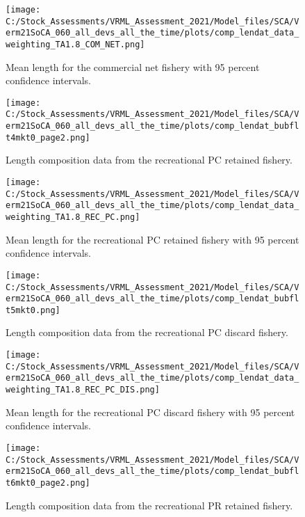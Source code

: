 \documentclass[11pt,
  english,
  a4paper,
]{article}
\begin{document}
\begin{figure}
\centering
\texttt{[image: C:/Stock\_Assessments/VRML\_Assessment\_2021/Model\_files/SCA/Verm21SoCA\_060\_all\_devs\_all\_the\_time/plots/comp\_lendat\_data\_weighting\_TA1.8\_COM\_NET.png]}
\caption{Mean length for the commercial net fishery with 95 percent confidence intervals.\label{fig:mean-com-len-data-COM-NET}}
\end{figure}

\begin{figure}
\centering
\texttt{[image: C:/Stock\_Assessments/VRML\_Assessment\_2021/Model\_files/SCA/Verm21SoCA\_060\_all\_devs\_all\_the\_time/plots/comp\_lendat\_bubflt4mkt0\_page2.png]}
\caption{Length composition data from the recreational PC retained fishery.\label{fig:len-data-REC-PC}}
\end{figure}

\begin{figure}
\centering
\texttt{[image: C:/Stock\_Assessments/VRML\_Assessment\_2021/Model\_files/SCA/Verm21SoCA\_060\_all\_devs\_all\_the\_time/plots/comp\_lendat\_data\_weighting\_TA1.8\_REC\_PC.png]}
\caption{Mean length for the recreational PC retained fishery with 95 percent confidence intervals.\label{fig:mean-com-len-data-REC-PC}}
\end{figure}

\begin{figure}
\centering
\texttt{[image: C:/Stock\_Assessments/VRML\_Assessment\_2021/Model\_files/SCA/Verm21SoCA\_060\_all\_devs\_all\_the\_time/plots/comp\_lendat\_bubflt5mkt0.png]}
\caption{Length composition data from the recreational PC discard fishery.\label{fig:len-data-REC-PC-DIS}}
\end{figure}

\begin{figure}
\centering
\texttt{[image: C:/Stock\_Assessments/VRML\_Assessment\_2021/Model\_files/SCA/Verm21SoCA\_060\_all\_devs\_all\_the\_time/plots/comp\_lendat\_data\_weighting\_TA1.8\_REC\_PC\_DIS.png]}
\caption{Mean length for the recreational PC discard fishery with 95 percent confidence intervals.\label{fig:mean-com-len-data-REC-PC-DIS}}
\end{figure}

\begin{figure}
\centering
\texttt{[image: C:/Stock\_Assessments/VRML\_Assessment\_2021/Model\_files/SCA/Verm21SoCA\_060\_all\_devs\_all\_the\_time/plots/comp\_lendat\_bubflt6mkt0\_page2.png]}
\caption{Length composition data from the recreational PR retained fishery.\label{fig:len-data-REC-PR}}
\end{figure}
\end{document}
